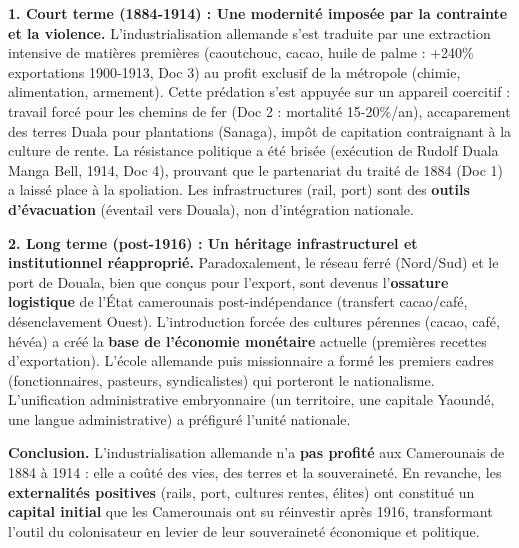\documentclass[11pt]{article}
\begin{document}
\begin{exoresolu}
\textbf{1. Court terme (1884-1914) : Une modernité imposée par la contrainte et la violence.} L'industrialisation allemande s'est traduite par une extraction intensive de matières premières (caoutchouc, cacao, huile de palme : +240\% exportations 1900-1913, Doc 3) au profit exclusif de la métropole (chimie, alimentation, armement). Cette prédation s'est appuyée sur un appareil coercitif : travail forcé pour les chemins de fer (Doc 2 : mortalité 15-20\%/an), accaparement des terres Duala pour plantations (Sanaga), impôt de capitation contraignant à la culture de rente. La résistance politique a été brisée (exécution de Rudolf Duala Manga Bell, 1914, Doc 4), prouvant que le \og partenariat \fg du traité de 1884 (Doc 1) a laissé place à la spoliation. Les infrastructures (rail, port) sont des \textbf{outils d'évacuation} (éventail vers Douala), non d'intégration nationale.

\textbf{2. Long terme (post-1916) : Un héritage infrastructurel et institutionnel réapproprié.} Paradoxalement, le réseau ferré (Nord/Sud) et le port de Douala, bien que conçus pour l'export, sont devenus l'\textbf{ossature logistique} de l'État camerounais post-indépendance (transfert cacao/café, désenclavement Ouest). L'introduction forcée des cultures pérennes (cacao, café, hévéa) a créé la \textbf{base de l'économie monétaire} actuelle (premières recettes d'exportation). L'école allemande puis missionnaire a formé les premiers cadres (fonctionnaires, pasteurs, syndicalistes) qui porteront le nationalisme. L'unification administrative embryonnaire (un territoire, une capitale Yaoundé, une langue administrative) a préfiguré l'unité nationale.

\textbf{Conclusion.} L'industrialisation allemande n'a \textbf{pas profité} aux Camerounais de 1884 à 1914 : elle a coûté des vies, des terres et la souveraineté. En revanche, les \textbf{externalités positives} (rails, port, cultures rentes, élites) ont constitué un \textbf{capital initial} que les Camerounais ont su réinvestir après 1916, transformant l'outil du colonisateur en levier de leur souveraineté économique et politique.
\end{exoresolu}
\end{document}

